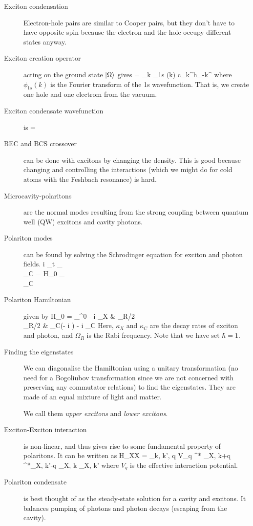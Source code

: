 \begin{description}
\item[Exciton condensation] Electron-hole pairs are similar to Cooper pairs, but they don't have to have opposite spin because the electron and the hole occupy different states anyway. 

\item[Exciton creation operator] acting on the ground state $\left| \Omega \right\rangle $ gives
\beq
\ket{\Phi} =  \sum_k \phi_{1s} (k) c_k^\dagger h_{-k}^\dagger \ket{\Omega}
\eeq
where $\phi_{1s}(k)$ is the Fourier transform of the 1s wavefunction. 
That is, we create one hole and one electrom from the vacuum. 

\item[Exciton condensate wavefunction] is
\beq
\ket{\Psi} =  
\eeq

\item[BEC and BCS crossover] can be done with excitons by changing the density. This is good because changing and controlling the interactions (which we might do for cold atoms with the Feshbach resonance) is hard. 

\item[Microcavity-polaritons] are the normal modes resulting from the strong coupling between quantum well (QW) excitons and cavity photons. 

\item[Polariton modes] can  be found by solving the Schrodinger equation for exciton and photon fields. 
\beq
i \p_t \bpmat \psi_\chi \\ \psi_C \epmat = H_0 \bpmat \psi_\chi \\ \psi_C\epmat
\eeq

\item[Polariton Hamiltonian] given by
\beq
H_0 = \bpmat \omega_\chi^0 - i \kappa_X & \Omega_R/2 \\ \Omega_R/2 & \omega_C(- i \nabla) - i \kappa_C \epmat
\eeq
Here, $\kappa_{X}$ and $\kappa_C$ are the decay rates of exciton and photon, and $\Omega_R$ is the Rabi frequency. Note that we have set $\hbar = 1$. 

\item[Finding the eigenstates] We can diagonalise the Hamiltonian using a unitary transformation (no need for a Bogoliubov transformation since we are not concerned with preserving any commutator relations) to find the eigenstates. They are made of an equal mixture of light and matter. 

We call them \emph{upper excitons} and \emph{lower excitons}. 

\item[Exciton-Exciton interaction] is non-linear, and thus gives rise to some fundamental property of polaritons.  It can be written as
\beq
H_{XX} =  \sum_{k, k', q}  V_q \psi^* _{X, k+q} \psi^*_{X, k'-q} \psi_{X, k} \psi_{X, k'}
\eeq
where $V_q$ is the effective interaction potential. 


\item[Polariton condensate] is best thought of as the steady-state solution for a cavity and excitons. It balances pumping of photons and photon decays (escaping from the cavity). 


\end{description}
